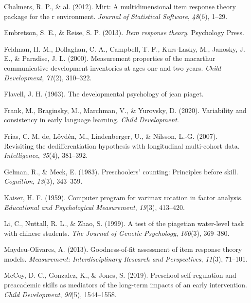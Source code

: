 \documentclass[10pt, letterpaper]{article}
\begin{document}
\leavevmode\hypertarget{ref-chalmers2012mirt}{}%
Chalmers, R. P., \& al. (2012). Mirt: A multidimensional item response
theory package for the r environment. \emph{Journal of Statistical
Software}, \emph{48}(6), 1--29.

\leavevmode\hypertarget{ref-embretson2013item}{}%
Embretson, S. E., \& Reise, S. P. (2013). \emph{Item response theory}.
Psychology Press.

\leavevmode\hypertarget{ref-feldman2000measurement}{}%
Feldman, H. M., Dollaghan, C. A., Campbell, T. F., Kurs-Lasky, M.,
Janosky, J. E., \& Paradise, J. L. (2000). Measurement properties of the
macarthur communicative development inventories at ages one and two
years. \emph{Child Development}, \emph{71}(2), 310--322.

\leavevmode\hypertarget{ref-flavell1963developmental}{}%
Flavell, J. H. (1963). The developmental psychology of jean piaget.

\leavevmode\hypertarget{ref-wordbank}{}%
Frank, M., Braginsky, M., Marchman, V., \& Yurovsky, D. (2020).
Variability and consistency in early language learning. \emph{Child
Development}.

\leavevmode\hypertarget{ref-de2007revisiting}{}%
Frias, C. M. de, Lövdén, M., Lindenberger, U., \& Nilsson, L.-G. (2007).
Revisiting the dedifferentiation hypothesis with longitudinal
multi-cohort data. \emph{Intelligence}, \emph{35}(4), 381--392.

\leavevmode\hypertarget{ref-gelman1983preschoolers}{}%
Gelman, R., \& Meck, E. (1983). Preschoolers' counting: Principles
before skill. \emph{Cognition}, \emph{13}(3), 343--359.

\leavevmode\hypertarget{ref-kaiser1959computer}{}%
Kaiser, H. F. (1959). Computer program for varimax rotation in factor
analysis. \emph{Educational and Psychological Measurement},
\emph{19}(3), 413--420.

\leavevmode\hypertarget{ref-li1999test}{}%
Li, C., Nuttall, R. L., \& Zhao, S. (1999). A test of the piagetian
water-level task with chinese students. \emph{The Journal of Genetic
Psychology}, \emph{160}(3), 369--380.

\leavevmode\hypertarget{ref-maydeu2013goodness}{}%
Maydeu-Olivares, A. (2013). Goodness-of-fit assessment of item response
theory models. \emph{Measurement: Interdisciplinary Research and
Perspectives}, \emph{11}(3), 71--101.

\leavevmode\hypertarget{ref-mccoy2019preschool}{}%
McCoy, D. C., Gonzalez, K., \& Jones, S. (2019). Preschool
self-regulation and preacademic skills as mediators of the long-term
impacts of an early intervention. \emph{Child Development},
\emph{90}(5), 1544--1558.
\end{document}
